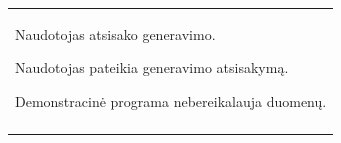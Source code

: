 \begin{center}
\begin{longtable}{|p{\textwidth}|}
			\setlist[seka,1]{label=*.\arabic*.,leftmargin=2em}
			\begin{seka}
					\item Naudotojas atsisako generavimo.
					\begin{seka}
						\item Naudotojas pateikia generavimo atsisakymą.
						\item Demonstracinė programa nebereikalauja duomenų.
					\end{seka}
			\end{seka}
    \\
    \\ \hline
    \end{longtable}
\end{center}
